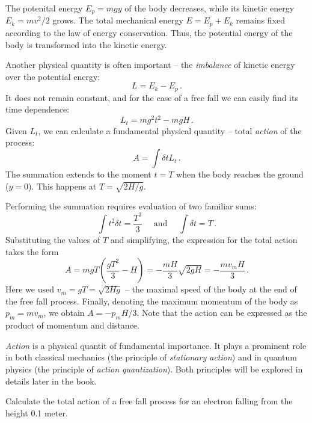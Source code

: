 The potenital energy $E_p=mgy$ of the body decreases, while its kinetic energy $E_k=mv^2/2$ grows. The total mechanical energy $E=E_p+E_k$ remains fixed according to the law of energy conservation. Thus, the potential energy of the body is transformed into the kinetic energy.

Another physical quantity is often important -- the \emph{imbalance} of kinetic energy over the potential energy:
\[
L = E_k - E_p\,.
\]
It does not remain constant, and for the case of a free fall we can easily find its time dependence:
\[
L_t = mg^2t^2 - mgH\,.
\]
Given $L_t$, we can calculate a fundamental physical quantity -- total \emph{action} of the process:
\[
A = \int\delta t L_t\,.
\]
The summation extends to the moment $t=T$ when the body reaches the ground ($y=0$). This happens at $T=\sqrt{2H/g}$.

Performing the summation requires evaluation of two familiar sums:
\[
\int t^2\delta t =\frac{T^3}{3}\quad\textrm{ and }\quad \int \delta t=T\,.
\]
Substituting the values of $T$ and simplifying, the expression for the total action takes the form
\[
A = mgT(\frac{gT^2}{3}-H)=-\frac{mH}{3}\sqrt{2gH}=-\frac{mv_{m}H}{3}\,.
\]
Here we used $v_m=gT=\sqrt{2Hg}$ -- the maximal speed of the body at the end of the free fall process. Finally, denoting the maximum momentum of the body as $p_m=mv_m$, we obtain $A=-p_m H/3$. Note that the action can be expressed as the product of momentum and distance.

\emph{Action} is a physical quantit of fundamental importance. It plays a prominent role in both classical mechanics (the principle of \emph{stationary action}) and in quantum physics (the principle of \emph{action quantization}). Both principles will be explored in details later in the book.

\begin{exercise}
	Calculate the total action of a free fall process for an electron falling from the height 0.1 meter.
\end{exercise}



